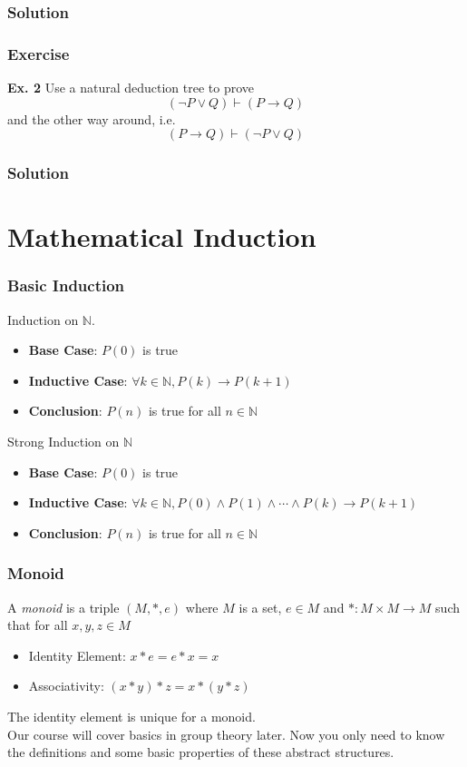 \documentclass[aspectratio=169]{beamer}
\begin{document}
\begin{frame}
  \frametitle{Solution}
\end{frame}
\begin{frame}
  \frametitle{Exercise}
  \textbf{Ex. 2} Use a natural deduction tree to prove 
  \begin{equation*}
      \left(\lnot P \lor Q \right) \vdash \left(P \rightarrow Q\right)
  \end{equation*}
  and the other way around, i.e. 
  \begin{equation*}
      \left(P \rightarrow Q\right) \vdash \left(\lnot P \lor Q \right)
  \end{equation*}
\end{frame}
\begin{frame}
  \frametitle{Solution}
\end{frame}
\section{Mathematical Induction}
\begin{frame}
  \frametitle{Basic Induction}
  Induction on $\mathbb{N}$. 
  \begin{itemize}
    \item \textbf{Base Case}: $P(0)$ is true 
    \item \textbf{Inductive Case}: $\forall k\in \mathbb{N}, P(k)\rightarrow P(k + 1)$ 
    \item \textbf{Conclusion}: $P(n)$ is true for all $n\in \mathbb{N}$ 
  \end{itemize}
  Strong Induction on $\mathbb{N}$
  \begin{itemize}
    \item \textbf{Base Case}: $P(0)$ is true 
    \item \textbf{Inductive Case}: $\forall k\in \mathbb{N}, P(0) \land P(1) \land \cdots \land P(k) \rightarrow P(k + 1)$ 
    \item \textbf{Conclusion}: $P(n)$ is true for all $n\in \mathbb{N}$ 
  \end{itemize}
\end{frame}
\begin{frame}
  \frametitle{Monoid}
  A \textit{monoid} is a triple $\left(M, *, e\right)$ where $M$ is a set, $e\in M$ and $*: M\times M\to M$ such that
  for all $x, y, z\in M$
  \begin{itemize}
    \item Identity Element: $x * e = e * x = x$
    \item Associativity: $\left(x * y\right) * z = x * \left(y * z\right)$
  \end{itemize}
  The identity element is unique for a monoid.
  \\[12pt]
  Our course will cover basics in group theory later. Now you only need to know the definitions and some basic
  properties of these abstract structures.
\end{frame}
\end{document}
